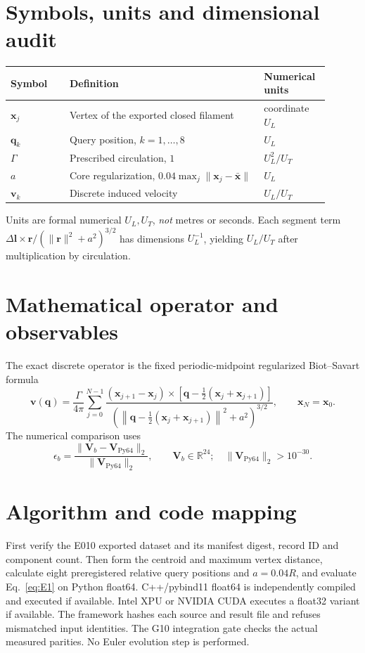 \documentclass[11pt,a4paper]{article}
\begin{document}
\section{Symbols, units and dimensional audit}
\begin{longtable}{p{0.17\linewidth}p{0.57\linewidth}p{0.16\linewidth}}\toprule
Symbol & Definition & Numerical units \\ \midrule
$\mathbf{x}_j$ & Vertex of the exported closed filament & coordinate $U_L$ \\
$\mathbf{q}_k$ & Query position, $k=1,\ldots,8$ & $U_L$ \\
$\Gamma$ & Prescribed circulation, $1$ & $U_L^2/U_T$ \\
$a$ & Core regularization, $0.04\max_j\|\mathbf{x}_j-\bar{\mathbf{x}}\|$ & $U_L$ \\
$\mathbf{v}_k$ & Discrete induced velocity & $U_L/U_T$ \\ \bottomrule\end{longtable}
Units are formal numerical $U_L,U_T$, \emph{not} metres or seconds. Each segment term $\Delta\mathbf{l}\times\mathbf{r}/(\|\mathbf{r}\|^2+a^2)^{3/2}$ has dimensions $U_L^{-1}$, yielding $U_L/U_T$ after multiplication by circulation.
\section{Mathematical operator and observables}
The exact discrete operator is the fixed periodic-midpoint regularized Biot--Savart formula
\begin{equation}
\mathbf{v}(\mathbf{q})=\frac{\Gamma}{4\pi}\sum_{j=0}^{N-1}
\frac{(\mathbf{x}_{j+1}-\mathbf{x}_{j})\times
[\mathbf{q}-\frac{1}{2}(\mathbf{x}_{j}+\mathbf{x}_{j+1})]}
{\left(\left\|\mathbf{q}-\frac{1}{2}(\mathbf{x}_{j}+\mathbf{x}_{j+1})\right\|^2+a^2\right)^{3/2}},\qquad \mathbf{x}_N=\mathbf{x}_0.
\label{eq:E1}
\end{equation}
The numerical comparison uses
\begin{equation}
\epsilon_b=\frac{\|\mathbf{V}_b-\mathbf{V}_{\mathrm{Py64}}\|_2}{\|\mathbf{V}_{\mathrm{Py64}}\|_2},\qquad
\mathbf{V}_b\in\mathbb{R}^{24};\quad \|\mathbf{V}_{\mathrm{Py64}}\|_2>10^{-30}.
\label{eq:E2}
\end{equation}
\section{Algorithm and code mapping}
First verify the E010 exported dataset and its manifest digest, record ID and component count. Then form the centroid and maximum vertex distance, calculate eight preregistered relative query positions and $a=0.04R$, and evaluate Eq.~\eqref{eq:E1} on Python float64. C++/pybind11 float64 is independently compiled and executed if available. Intel XPU or NVIDIA CUDA executes a float32 variant if available. The framework hashes each source and result file and refuses mismatched input identities. The G10 integration gate checks the actual measured parities. No Euler evolution step is performed.
\end{document}
